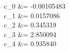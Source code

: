 c_0 &= -0.00105483 \\ 
c_1 &= 0.0157086 \\ 
c_2 &= 0.345319 \\ 
c_3 &= 2.850094 \\ 
c_4 &= 0.935840 \\ 

